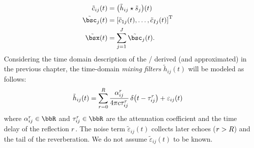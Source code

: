 \begin{align}
    \tilde{\img}_{\idxMic\idxSrc}(t) &= \kparen{\tilde{\rir}_{\idxMic\idxSrc} \convCont \tilde{\src}_\idxSrc} (t)     \label{eq:processing:mixing:img} \\
    \tilde{\imgs}_\idxSrc(t)         &= \ktranspose{\klist{\tilde{\img}_{1\idxSrc}(t), \dots, \tilde{\img}_{\numMics\idxSrc}(t)}} \nonumber\\
    \tilde{\mics}(t)                 &= \sum_{\idxSrc=1}^{\numSrcs} \tilde{\imgs}_\idxSrc(t)                    \label{eq:processing:mixing:mix}
    .
\end{align}%
Considering the time domain description of the \RIR/ derived (and approximated) in the previous chapter,
the time-domain \emph{mixing filters} $\tilde{h}_{ij}( t)$ will be modeled as follows:
\begin{equation}\label{eq:processing:mixing_filter}
    \tilde{h}_{ij}( t) = \sum_{\idxEch=0}^{\numEchs} \frac{\absCoeff_{ij}^r}{4 \pi \speedOfSound \tau_{ij}^r}
                          \diracOf{t - \tau_{ij}^r} + \varepsilon_{ij}(t)
\end{equation}
where $\absCoeff_{ij}^r \in \R$ and $\tau_{ij}^r \in \R$ are the attenuation coefficient and the time delay of the reflection $r$.
The noise term $\tilde{\varepsilon}_{ij}( t)$ collects later echoes ($r > R$) and the tail of the reverberation.
We do not assume $\tilde{\varepsilon}_{ij}( t)$ to be known.


